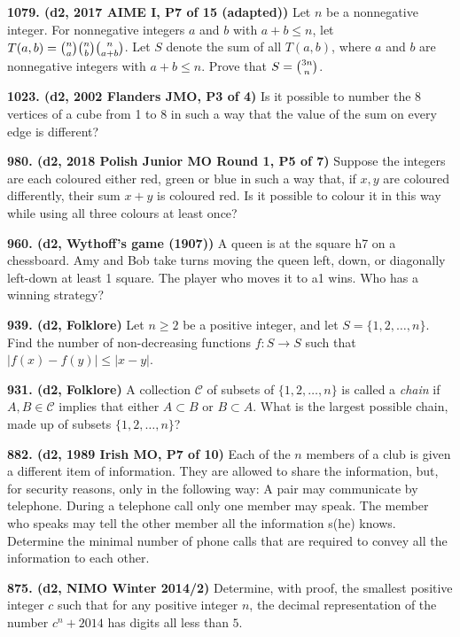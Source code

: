 \documentclass{article}
\begin{document}
        \textbf{1079. (\color{red}d2\color{black}, 2017 AIME I, P7 of 15 (adapted))} Let $n$ be a nonnegative integer. For nonnegative integers $a$ and $b$ with $a + b \leq n$, let $T(a, b) = \tbinom{n}{a} \tbinom{n}{b} \tbinom{n}{a + b}$. Let $S$ denote the sum of all $T(a, b)$, where $a$ and $b$ are nonnegative integers with $a + b \leq n$. Prove that $S = \tbinom{3n}{n}$.

        \textbf{1023. (\color{red}d2\color{black}, 2002 Flanders JMO, P3 of 4)} Is it possible to number the 8 vertices of a cube from 1 to 8 in such a way that the value of the sum on every edge is different?

        \textbf{980. (\color{red}d2\color{black}, 2018 Polish Junior MO Round 1, P5 of 7)} Suppose the integers are each coloured either red, green or blue in such a way that, if $x, y$ are coloured differently, their sum $x + y$ is coloured red. Is it possible to colour it in this way while using all three colours at least once?

        \textbf{960. (\color{red}d2\color{black}, Wythoff's game (1907))} A queen is at the square h7 on a chessboard. Amy and Bob take turns moving the queen left, down, or diagonally left-down at least 1 square. The player who moves it to a1 wins. Who has a winning strategy?

        \textbf{939. (\color{red}d2\color{black}, Folklore)} Let $n \geq 2$ be a positive integer, and let $S = \{1, 2, \dots, n\}$. Find the number of non-decreasing functions $f:S \rightarrow S$ such that $|f(x) - f(y)| \leq |x - y|$.

        \textbf{931. (\color{red}d2\color{black}, Folklore)} A collection $\mathcal{C}$ of subsets of $\{1, 2, \dots, n\}$ is called a \emph{chain} if $A, B \in \mathcal{C}$ implies that either $A \subset B$ or $B \subset A$. What is the largest possible chain, made up of subsets $\{1, 2, \dots, n\}$?

        \textbf{882. (\color{red}d2\color{black}, 1989 Irish MO, P7 of 10)} Each of the $n$ members of a club is given a different item of information. They are allowed to share the information, but, for security reasons, only in the following way: A pair may communicate by telephone. During a telephone call only one member may speak. The member who speaks may tell the other member all the information s(he) knows. Determine the minimal number of phone calls that are required to convey all the information to each other.

        \textbf{875. (\color{red}d2\color{black}, NIMO Winter 2014/2)} Determine, with proof, the smallest positive integer $c$ such that for any positive integer $n$, the decimal representation of the number $c^n + 2014$ has digits all less than $5$.
\end{document}
